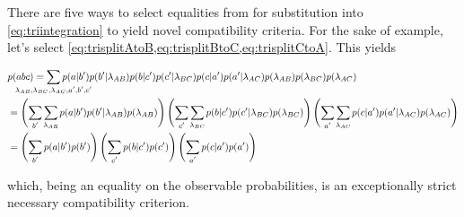 There are five ways to select equalities from  for substitution into \cref{eq:triintegration} to yield novel compatibility criteria. For the sake of example, let's select \cref{eq:trisplitAtoB,eq:trisplitBtoC,eq:trisplitCtoA}. This yields
\begin{widetext}
\begin{align}\begin{split}\label{eq:triexampleint}
&p(abc)=\sum\limits_{\mathclap{\lambda_{AB},\lambda_{BC},\lambda_{AC},a^{\prime},b^{\prime},c^{\prime}}}
p(a|b^{\prime})p(b^{\prime}|\lambda_{AB})p(b|c^{\prime})p(c^{\prime}|\lambda_{BC})p(c|a^{\prime})p(a^{\prime}|\lambda_{AC})p(\lambda_{AB})p(\lambda_{BC})p(\lambda_{AC})\\
&=
\left(\sum\limits_{\mathclap{b^{\prime}}}\sum\limits_{\mathclap{\lambda_{AB}}}
p(a|b^{\prime})p(b^{\prime}|\lambda_{AB})p(\lambda_{AB})
\right)
\left(\sum\limits_{\mathclap{c^{\prime}}}\sum\limits_{\mathclap{\lambda_{BC}}}
p(b|c^{\prime})p(c^{\prime}|\lambda_{BC})p(\lambda_{BC})
\right)
\left(\sum\limits_{\mathclap{a^{\prime}}}\sum\limits_{\mathclap{\lambda_{AC}}}
p(c|a^{\prime})p(a^{\prime}|\lambda_{AC})p(\lambda_{AC})
\right)\\
&=
\left(\sum\limits_{\mathclap{b^{\prime}}}
p(a|b^{\prime})p(b^{\prime})
\right)
\left(\sum\limits_{\mathclap{c^{\prime}}}
p(b|c^{\prime})p(c^{\prime})
\right)
\left(\sum\limits_{\mathclap{a^{\prime}}}
p(c|a^{\prime})p(a^{\prime})
\right)
\end{split}\end{align}
\end{widetext}
which, being an equality on the observable probabilities, is an exceptionally strict necessary compatibility criterion.
